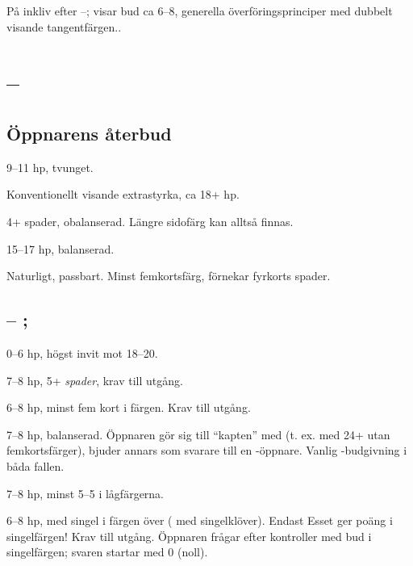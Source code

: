 P{\aa} inkliv efter --;  visar bud 
ca 6--8, generella överföringsprinciper med dubbelt visande tangentfärgen..

\section{ -- }
\subsection{\"Oppnarens {\aa}terbud}

\bbe
   \item[pass] 9--11 hp, tvunget.
   \item[\hj{1}] Konventionellt visande extrastyrka, ca 18+ hp.
   \item[\spa{1}] 4+ spader, obalanserad. Längre sidofärg kan alltså finnas.
   \item[\NT{1}] 15--17 hp, balanserad.
   \item[\la{2}, \hj{2}] Naturligt, passbart. Minst femkortsf\"arg,
   förnekar fyrkorts spader.
\ebe

\subsection{ -- ; }

\bbe
   \item[\spa{1}] 0--6 hp, h\"ogst invit mot 18--20.
   \item[\NT{1}] 7--8 hp, 5+ \emph{spader}, krav till utg{\aa}ng.
   \item[\la{2} \hj{2}] 6--8 hp, minst fem kort i f\"argen. Krav 
                        till utg{\aa}ng.
   \item[\spa{2}] 7--8 hp, balanserad. Öppnaren g\"or sig till ``kapten''
                  med  (t. ex. med 24+ utan femkortsf\"arger),
                  bjuder annars som svarare till en
                  -\"oppnare. Vanlig -budgivning i båda fallen.
   \item[\NT{2}] 7--8 hp, minst 5--5 i l{\aa}gf\"argerna.
   \item[\la{3}, \ho{3}] 6--8 hp,  med singel i
                  f\"argen \"over ( med singelkl\"over). Endast Esset
                  ger po\"ang i singelf\"argen!
                  Krav till utg{\aa}ng. Öppnaren fr{\aa}gar efter kontroller
                  med bud i singelf\"argen; svaren startar med 0 (noll).
\ebe

